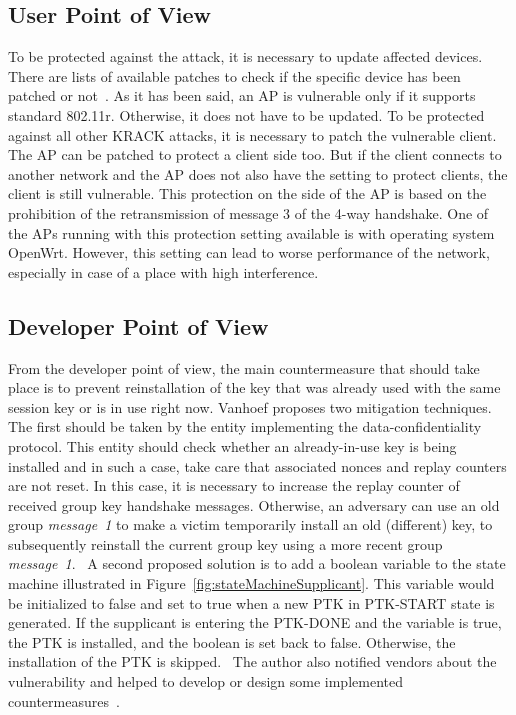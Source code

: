 \subsection{User Point of View}
To be protected against the attack, it is necessary to update affected devices. There are lists of available patches to check if the specific device has been patched or not~\cite{kristate_2018}. As it has been said, an AP is vulnerable only if it supports standard 802.11r. Otherwise, it does not have to be updated. To be protected against all other KRACK attacks, it is necessary to patch the vulnerable client. The AP can be patched to protect a client side too. But if the client connects to another network and the AP does not also have the setting to protect clients, the client is still vulnerable. This protection on the side of the AP is based on the prohibition of the retransmission of message 3 of the 4-way handshake. One of the APs running with this protection setting available is with operating system OpenWrt. However, this setting can lead to worse performance of the network, especially in case of a place with high interference.

\subsection{Developer Point of View}

From the developer point of view, the main countermeasure that should take place is to prevent reinstallation of the key that was already used with the same session key or is in use right now. 
Vanhoef proposes two mitigation techniques. The first should be taken by the entity implementing the data-confidentiality protocol. This entity should check whether an already-in-use key is being installed and in such a case, take care that associated nonces and replay counters are not reset. In this case, it is necessary to increase the replay counter of received group key handshake messages. Otherwise, an adversary can use an old group \textit{message~1} to make a victim temporarily install an old (different) key, to subsequently reinstall the current group key using a more recent group \textit{message~1}.~\cite{VA_ccs2017}
A second proposed solution is to add a boolean variable to the state machine illustrated in Figure~\ref{fig:stateMachineSupplicant}. This variable would be initialized to false and set to true when a new PTK in PTK-START state is generated. If the supplicant is entering the PTK-DONE and the variable is true, the PTK is installed, and the boolean is set back to false. Otherwise, the installation of the PTK is skipped.~\cite{VA_ccs2017} 
The author also notified vendors about the vulnerability and helped to develop or design some implemented countermeasures~\cite{VA17}. 
 

 
